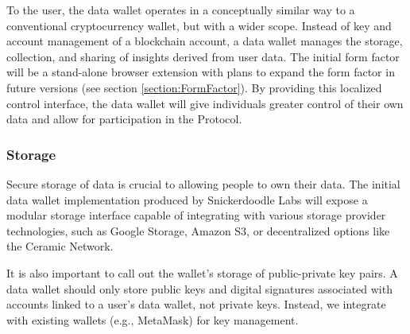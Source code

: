 To the user, the data wallet operates in a conceptually similar way to a conventional cryptocurrency wallet, but with a wider scope. 
Instead of key and account management of a blockchain account, a data wallet manages the storage, collection, and sharing of insights derived 
from user data. The initial form factor will be a stand-alone browser extension with plans to expand the form factor in future versions (see 
section \ref{section:FormFactor}). By providing this localized control interface, the data wallet will give individuals greater control 
of their own data and allow for participation in the Protocol.


\subsubsection{Storage}
Secure storage of data is crucial to allowing people to own their data. The initial data wallet implementation produced by 
Snickerdoodle Labs will expose a modular storage interface capable of integrating with various storage provider technologies, 
such as Google Storage, Amazon S3, or decentralized options like the Ceramic Network.

It is also important to call out the wallet's storage of public-private key pairs. A data wallet should only store public keys 
and digital signatures associated with accounts linked to a user's data wallet, not private keys. 
Instead, we integrate with existing wallets (e.g., MetaMask) for key management.


